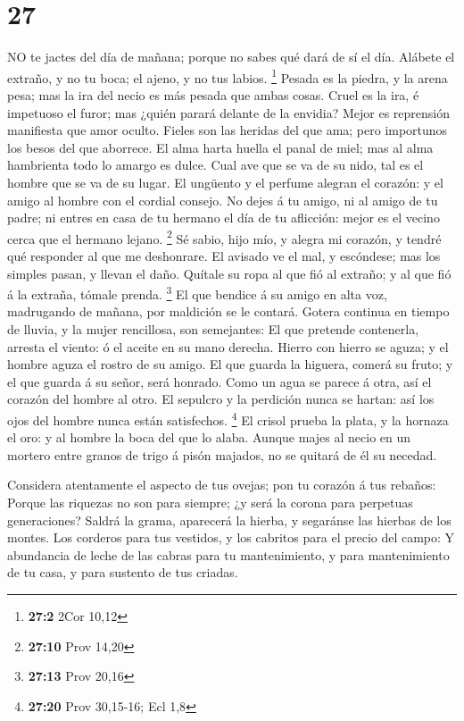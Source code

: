 \hypertarget{section-26}{%
\section{27}\label{section-26}}

 NO te jactes del día de mañana; porque no sabes qué dará de
sí el día.  Alábete el extraño, y no tu boca; el ajeno, y no
tus labios. \footnote{\textbf{27:2} 2Cor 10,12}  Pesada es
la piedra, y la arena pesa; mas la ira del necio es más pesada que ambas
cosas.  Cruel es la ira, é impetuoso el furor; mas ¿quién
parará delante de la envidia?  Mejor es reprensión
manifiesta que amor oculto.  Fieles son las heridas del que
ama; pero importunos los besos del que aborrece.  El alma
harta huella el panal de miel; mas al alma hambrienta todo lo amargo es
dulce.  Cual ave que se va de su nido, tal es el hombre que
se va de su lugar.  El ungüento y el perfume alegran el
corazón: y el amigo al hombre con el cordial consejo.  No
dejes á tu amigo, ni al amigo de tu padre; ni entres en casa de tu
hermano el día de tu aflicción: mejor es el vecino cerca que el hermano
lejano. \footnote{\textbf{27:10} Prov 14,20}  Sé sabio,
hijo mío, y alegra mi corazón, y tendré qué responder al que me
deshonrare.  El avisado ve el mal, y escóndese; mas los
simples pasan, y llevan el daño.  Quítale su ropa al que
fió al extraño; y al que fió á la extraña, tómale prenda. \footnote{\textbf{27:13}
  Prov 20,16}  El que bendice á su amigo en alta voz,
madrugando de mañana, por maldición se le contará.  Gotera
continua en tiempo de lluvia, y la mujer rencillosa, son semejantes:
 El que pretende contenerla, arresta el viento: ó el aceite
en su mano derecha.  Hierro con hierro se aguza; y el
hombre aguza el rostro de su amigo.  El que guarda la
higuera, comerá su fruto; y el que guarda á su señor, será honrado.
 Como un agua se parece á otra, así el corazón del hombre
al otro.  El sepulcro y la perdición nunca se hartan: así
los ojos del hombre nunca están satisfechos. \footnote{\textbf{27:20}
  Prov 30,15-16; Ecl 1,8}  El crisol prueba la plata, y la
hornaza el oro: y al hombre la boca del que lo alaba. 
Aunque majes al necio en un mortero entre granos de trigo á pisón
majados, no se quitará de él su necedad.

 Considera atentamente el aspecto de tus ovejas; pon tu
corazón á tus rebaños:  Porque las riquezas no son para
siempre; ¿y será la corona para perpetuas generaciones? 
Saldrá la grama, aparecerá la hierba, y segaránse las hierbas de los
montes.  Los corderos para tus vestidos, y los cabritos
para el precio del campo:  Y abundancia de leche de las
cabras para tu mantenimiento, y para mantenimiento de tu casa, y para
sustento de tus criadas.


